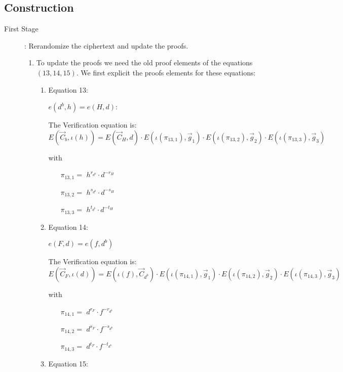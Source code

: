 \subsection{Construction}

\begin{description}
\item[First Stage]: Rerandomize the ciphertext and update the proofs.
  \begin{enumerate}
  \item To update the proofs we need the old proof elements of the equations $(13, 14, 15)$. We first explicit the proofs elements for these equations:
    \begin{enumerate}
    \item Equation 13:

      $e(\boxed{d^b},h) = e(\boxed{H}, d)$: 
      
      The Verification equation is: $E(\vec{C}_b, \iota(h)) = E(\vec{C}_{H}, d) \cdot E(\iota(\pi_{13,1}), \vec{g}_1)\cdot E(\iota(\pi_{13,2}), \vec{g}_2)\cdot E(\iota(\pi_{13,3}), \vec{g}_3)$

      with
      \begin{itemize}
      \item[$\pi_{13,1} = $] $h^{r_{d^b}} \cdot d^{-r_{H}}$
      \item[$\pi_{13,2} = $] $h^{s_{d^b}} \cdot d^{-s_{H}}$
      \item[$\pi_{13,3} = $] $h^{t_{d^b}} \cdot d^{-t_{H}}$
      \end{itemize}
      
    \item Equation 14:

      $e(\boxed{F},d) = e(f, \boxed{d^b})$

      The Verification equation is: $E(\vec{C}_F, \iota(d)) = E(\iota(f), \vec{C}_{d^b}) \cdot E(\iota(\pi_{14,1}), \vec{g}_1)\cdot E(\iota(\pi_{14,2}), \vec{g}_2)\cdot E(\iota(\pi_{14,3}), \vec{g}_3)$

      with

      \begin{itemize}
      \item[$\pi_{14,1} = $] $d^{r_F} \cdot f^{-r_{d^b}}$    
      \item[$\pi_{14,2} = $] $d^{s_F} \cdot f^{-s_{d^b}}$    
      \item[$\pi_{14,3} = $] $d^{t_F} \cdot f^{-t_{d^b}}$
      \end{itemize}
      
    \item Equation 15:


\end{enumerate}
\end{enumerate}
\end{description}
